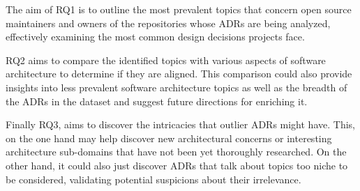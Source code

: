         The aim of RQ1 is to outline the most prevalent topics that concern open source maintainers and owners of the repositories whose ADRs are being analyzed, effectively examining the most common design decisions projects face.
        
        RQ2 aims to compare the identified topics with various aspects of software architecture to determine if they are aligned. This comparison could also provide insights into less prevalent software architecture topics as well as the breadth of the ADRs in the dataset and suggest future directions for enriching it.
        
        Finally RQ3, aims to discover the intricacies that outlier ADRs might have. This, on the one hand may help discover new architectural concerns or interesting architecture sub-domains that have not been yet thoroughly researched. On the other hand, it could also just discover ADRs that talk about topics too niche to be considered, validating potential suspicions about their irrelevance.